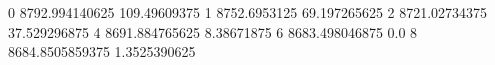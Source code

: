 0 8792.994140625 109.49609375
1 8752.6953125 69.197265625
2 8721.02734375 37.529296875
4 8691.884765625 8.38671875
6 8683.498046875 0.0
8 8684.8505859375 1.3525390625
